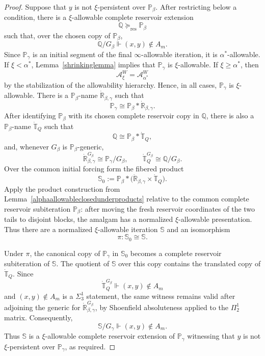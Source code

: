 \documentclass[a4paper,11pt]{article}
\newcommand{\forceP}{\mathbb{P}}
\newcommand{\forceQ}{\mathbb{Q}}
\newcommand{\forceR}{\mathbb{R}}
\newcommand{\forceS}{\mathbb{S}}
\begin{document}
\begin{proof}
Suppose that $y$ is not $\xi$-persistent over $\forceP_\beta$.  After
restricting below a condition, there is a $\xi$-allowable complete reservoir
extension
\[
   \forceQ\succeq_{\mathrm{res}}\forceP_\beta
\]
such that, over the chosen copy of $\forceP_\beta$,
\[
   \forceQ/G_\beta\Vdash (x,y)\notin A_m .
\]
Since $\forceP_\gamma$ is an initial segment of the final
$\infty$-allowable iteration, it is $\alpha^\ast$-allowable.  If
$\xi<\alpha^\ast$, Lemma~\ref{shrinkinglemma} implies that
$\forceP_\gamma$ is $\xi$-allowable.  If $\xi\geq\alpha^\ast$, then
\[
   \mathcal A^W_\xi=\mathcal A^W_{\alpha^\ast}
\]
by the stabilization of the allowability hierarchy.  Hence, in all cases,
$\forceP_\gamma$ is $\xi$-allowable.  There is a $\forceP_\beta$-name
$\dot{\forceR}_{\beta,\gamma}$ such that
\[
   \forceP_\gamma
   \cong
   \forceP_\beta*\dot{\forceR}_{\beta,\gamma}.
\]
After identifying $\forceP_\beta$ with its chosen complete reservoir copy in
$\forceQ$, there is also a $\forceP_\beta$-name $\dot{\mathbb T}_Q$ such that
\[
   \forceQ
   \cong
   \forceP_\beta*\dot{\mathbb T}_Q,
\]
and, whenever $G_\beta$ is $\forceP_\beta$-generic,
\[
   \dot{\forceR}_{\beta,\gamma}^{G_\beta}
      \cong\forceP_\gamma/G_\beta,
   \qquad
   \dot{\mathbb T}_Q^{G_\beta}
      \cong\forceQ/G_\beta.
\]
Over the common initial forcing form the fibered product
\[
   \forceS_0
   :=
   \forceP_\beta*
   \bigl(
      \dot{\forceR}_{\beta,\gamma}
      \times
      \dot{\mathbb T}_Q
   \bigr).
\]
Apply the product construction from
Lemma~\ref{alphaallowableclosedunderproducts} relative to the common complete
reservoir subiteration $\forceP_\beta$: after moving the fresh reservoir
coordinates of the two tails to disjoint blocks, the amalgam has a normalized
$\xi$-allowable presentation.  Thus there are a normalized $\xi$-allowable
iteration $\forceS$ and an isomorphism
\[
   \pi:\forceS_0\cong\forceS.
\]

Under $\pi$, the canonical copy of $\forceP_\gamma$ in $\forceS_0$ becomes a
complete reservoir subiteration of $\forceS$.  The quotient of $\forceS$ over
this copy contains the translated copy of $\dot{\mathbb T}_Q$.  Since
\[
   \dot{\mathbb T}_Q^{G_\beta}
   \Vdash (x,y)\notin A_m
\]
and $(x,y)\notin A_m$ is a $\Sigma^1_3$ statement, the same witness remains
valid after adjoining the generic for
$\dot{\forceR}_{\beta,\gamma}^{G_\beta}$, by Shoenfield absoluteness applied
to the $\Pi^1_2$ matrix.  Consequently,
\[
   \forceS/G_\gamma\Vdash (x,y)\notin A_m.
\]
Thus $\forceS$ is a $\xi$-allowable complete reservoir extension of
$\forceP_\gamma$ witnessing that $y$ is not $\xi$-persistent over
$\forceP_\gamma$, as required.
\end{proof}
\end{document}
